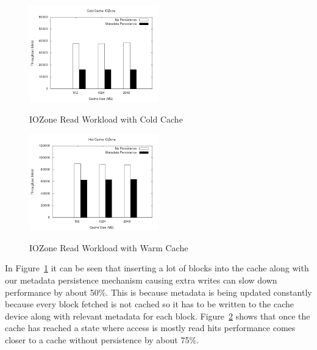 \graphicspath{{../Results/}}

\begin{figure}[t]
  \caption{IOZone Read Workload with Cold Cache}
  \centering \includegraphics[width=0.5\textwidth]{results_first.png}
  \label{fig:iozone-cold}
\end{figure}

\begin{figure}[t]
  \caption{IOZone Read Workload with Warm Cache}
  \centering \includegraphics[width=0.5\textwidth]{results_second.png}
  \label{fig:iozone-warm}
\end{figure}

In Figure~\ref{fig:iozone-cold} it can be seen that inserting a lot of
blocks into the cache along with our metadata persistence mechanism
causing extra writes can slow down performance by about 50\%. This is
because metadata is being updated constantly because every block
fetched is not cached so it has to be written to the cache device
along with relevant metadata for each
block. Figure~\ref{fig:iozone-warm} shows that once the cache has
reached a state where access is mostly read hits performance comes
closer to a cache without persistence by about 75\%.

